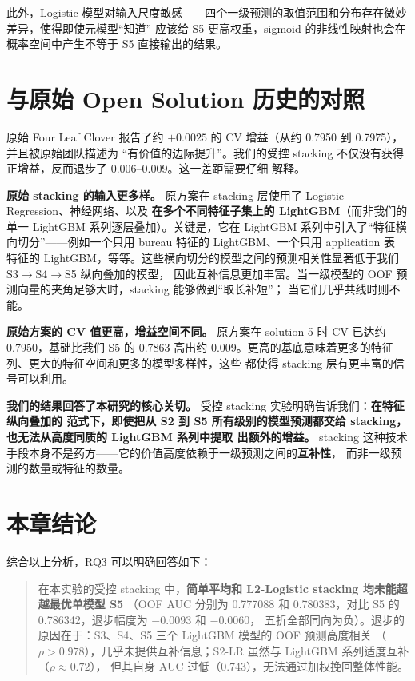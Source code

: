 \documentclass[11pt,UTF8,fontset=windows]{ctexrep}
\begin{document}
此外，Logistic 模型对输入尺度敏感——四个一级预测的取值范围和分布存在微妙差异，使得即使元模型“知道”
应该给 S5 更高权重，sigmoid 的非线性映射也会在概率空间中产生不等于 S5 直接输出的结果。

\section{与原始 Open Solution 历史的对照}

原始 Four Leaf Clover 报告了约 $+0.0025$ 的 CV 增益（从约 0.7950 到 0.7975），并且被原始团队描述为
“有价值的边际提升”。我们的受控 stacking 不仅没有获得正增益，反而退步了 0.006--0.009。这一差距需要仔细
解释。

\textbf{原始 stacking 的输入更多样。} 原方案在 stacking 层使用了 Logistic Regression、神经网络、以及
\textbf{在多个不同特征子集上的 LightGBM}（而非我们的单一 LightGBM 系列逐层叠加）。关键是，它在
LightGBM 系列中引入了“特征横向切分”——例如一个只用 bureau 特征的 LightGBM、一个只用 application 表
特征的 LightGBM，等等。这些横向切分的模型之间的预测相关性显著低于我们 S3$\to$S4$\to$S5 纵向叠加的模型，
因此互补信息更加丰富。当一级模型的 OOF 预测向量的夹角足够大时，stacking 能够做到“取长补短”；
当它们几乎共线时则不能。

\textbf{原始方案的 CV 值更高，增益空间不同。} 原方案在 solution-5 时 CV 已达约 0.7950，基础比我们
S5 的 0.7863 高出约 0.009。更高的基底意味着更多的特征列、更大的特征空间和更多的模型多样性，这些
都使得 stacking 层有更丰富的信号可以利用。

\textbf{我们的结果回答了本研究的核心关切。} 受控 stacking 实验明确告诉我们：\textbf{在特征纵向叠加的
范式下，即使把从 S2 到 S5 所有级别的模型预测都交给 stacking，也无法从高度同质的 LightGBM 系列中提取
出额外的增益。} stacking 这种技术手段本身不是药方——它的价值高度依赖于一级预测之间的\textbf{互补性}，
而非一级预测的数量或特征的数量。

\section{本章结论}

综合以上分析，RQ3 可以明确回答如下：

\begin{quote}
在本实验的受控 stacking 中，\textbf{简单平均和 L2-Logistic stacking 均未能超越最优单模型 S5}
（OOF AUC 分别为 0.777088 和 0.780383，对比 S5 的 0.786342，退步幅度为 $-0.0093$ 和 $-0.0060$，
五折全部同向为负）。退步的原因在于：S3、S4、S5 三个 LightGBM 模型的 OOF 预测高度相关
（$\rho > 0.978$），几乎未提供互补信息；S2-LR 虽然与 LightGBM 系列适度互补（$\rho \approx 0.72$），
但其自身 AUC 过低（0.743），无法通过加权挽回整体性能。
\end{quote}
\end{document}
